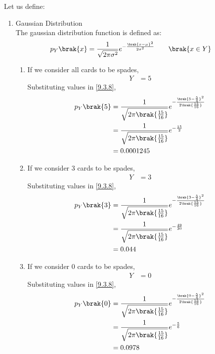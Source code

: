 \documentclass[journal,12pt,twocolumn]{IEEEtran}
\theoremstyle{remark}
\begin{document}
\solution
Let us define:
\begin{table}[!ht]

\end{table}
\begin{enumerate}[label=(\roman*)]
\item {Gaussian Distribution}\\
The gaussian distribution function is defined as:
\begin{align}
p_Y\brak{x} &= \frac{1}{\sqrt{2\pi{\sigma}^2}} e^{-\frac{\brak{x-\mu}^2}{2{\sigma}^2}}\label{9.3.8} \qquad \brak{x \in Y}
\end{align}
\begin{enumerate}[label=(\alph*)]
\item If we consider all cards to be spades,
\begin{align}
Y &= 5
\end{align}
Substituting values in \eqref{9.3.8},
\begin{align}
p_Y\brak{5} &= \frac{1}{\sqrt{2\pi\brak{\frac{15}{16}}}} e^{-\frac{\brak{5 - \frac{5}{4}}^2}{2\brak{\frac{15}{16}}}}\\
		   &= \frac{1}{\sqrt{2\pi\brak{\frac{15}{16}}}} e^{-\frac{15}{2}}\\
	           &= 0.0001245
\end{align}
\item If we consider 3 cards to be spades,
\begin{align}
Y &= 3
\end{align}
Substituting values in \eqref{9.3.8},
\begin{align}
p_Y\brak{3} &= \frac{1}{\sqrt{2\pi\brak{\frac{15}{16}}}} e^{-\frac{\brak{3 - \frac{5}{4}}^2}{2\brak{\frac{15}{16}}}}\\
			      &= \frac{1}{\sqrt{2\pi\brak{\frac{15}{16}}}} e^{-\frac{49}{30}}\\
			      &= 0.044
\end{align}
\item If we consider 0 cards to be spades,
\begin{align}
Y &= 0
\end{align}
Substituting values in \eqref{9.3.8},
\begin{align}
p_Y\brak{0} &= \frac{1}{\sqrt{2\pi\brak{\frac{15}{16}}}} e^{-\frac{\brak{0 - \frac{5}{4}}^2}{2\brak{\frac{15}{16}}}}\\
			       &= \frac{1}{\sqrt{2\pi\brak{\frac{15}{16}}}} e^{-\frac{5}{6}}\\
			       &= 0.0978
\end{align}

\end{enumerate}
\end{enumerate}
\end{document}
